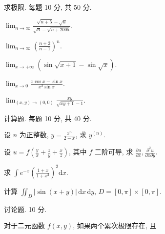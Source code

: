 \par{}
求极限. 每题 10 分, 共 50 分.\par
$\lim_{n\to \infty}\frac{\sqrt{n + 5} - \sqrt{n}}{\sqrt{n} - \sqrt{n + 2005}}.$\par
$\lim_{n\to \infty}\left(\frac{n + 2}{n - 1}\right)^n.$\par
$\lim_{x\to +\infty}\left(\sin \sqrt{x + 1} -\sin \sqrt{x}\right).$\par
$\lim_{x\to 0}\frac{x\cos x - \sin x}{x^2\sin x}.$\par
$\lim_{(x,y)\to(0,0)}\frac{xy}{\sqrt{xy+1}-1}.$\par
\par{}
计算题. 每题 10 分, 共 40 分.\par
设 $n$ 为正整数, $y = \frac{x^n}{2 - x}$, 求 $y^{(n)}$.\par
设 $u = f\left(\frac{y}{x} + \frac{z}{y} + \frac{x}{z}\right)$, 其中 $f$ 二阶可导, 求 $\frac{\partial u}{\partial x}, \frac{\partial^2 u}{\partial x \partial y}$.\par
求 $\int e^{-x}\left(\frac{1 + x}{1 + x^2}\right)^2\mathrm{d}x.$\par
计算 $\iint_{D} |\sin(x + y)| \, \mathrm{d}x \, \mathrm{d}y$, $D = [0, \pi] \times [0, \pi]$.\par
\par{}
讨论题. 10 分.\par
\par{}
对于二元函数 $f(x, y)$, 如果两个累次极限存在, 且\par
